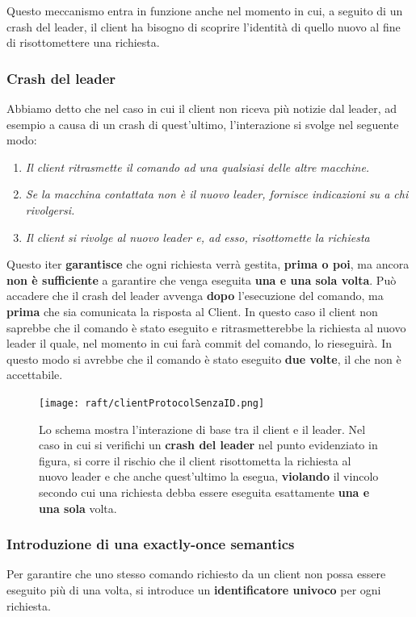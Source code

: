 	Questo meccanismo entra in funzione anche nel momento in cui, a seguito di un crash del leader, il client ha bisogno di scoprire l'identità di quello nuovo al fine di risottomettere una richiesta.  

	\subsubsection{Crash del leader}

	Abbiamo detto che nel caso in cui il client non riceva più notizie dal leader, ad esempio a causa di un crash di quest'ultimo, l'interazione si svolge nel seguente modo:

	\begin{enumerate}
		\item{\emph{Il client ritrasmette il comando ad una qualsiasi delle altre macchine. }}
		\item{\emph{Se la macchina contattata non è il nuovo leader, fornisce indicazioni su a chi rivolgersi.}}
		\item{\emph{Il client si rivolge al nuovo leader e, ad esso, risottomette la richiesta}}
	\end{enumerate}

	Questo iter \textbf{garantisce} che ogni richiesta verrà gestita, \textbf{prima o poi}, ma ancora \textbf{non è sufficiente} a garantire che venga eseguita \textbf{una e una sola volta}. 
	Può accadere che il crash del leader avvenga \textbf{dopo} l'esecuzione del comando, ma \textbf{prima} che sia comunicata la risposta al Client. 
	In questo caso il client non saprebbe che il comando è stato eseguito e ritrasmetterebbe la richiesta al nuovo leader il quale, nel momento in cui farà commit del comando, lo rieseguirà. In questo modo si avrebbe che il comando è stato eseguito \textbf{due volte}, il che non è accettabile.

	  \begin{figure}[H]
	    \centering
	    \texttt{[image: raft/clientProtocolSenzaID.png]}
	    \caption{Lo schema mostra l'interazione di base tra il client e il leader. Nel caso in cui si verifichi un \textbf{crash del leader} nel punto evidenziato in figura, si corre il rischio che il client risottometta la richiesta al nuovo leader e che anche quest'ultimo la esegua, \textbf{violando} il vincolo secondo cui una richiesta debba essere eseguita esattamente \textbf{una e una sola} volta.  }
	    \label{fig:figure 12}
	  \end{figure}
 
 	\subsubsection{Introduzione di una exactly-once semantics}
 	Per garantire che uno stesso comando richiesto da un client non possa essere eseguito più di una volta, si introduce un \textbf{identificatore univoco} per ogni richiesta.  

